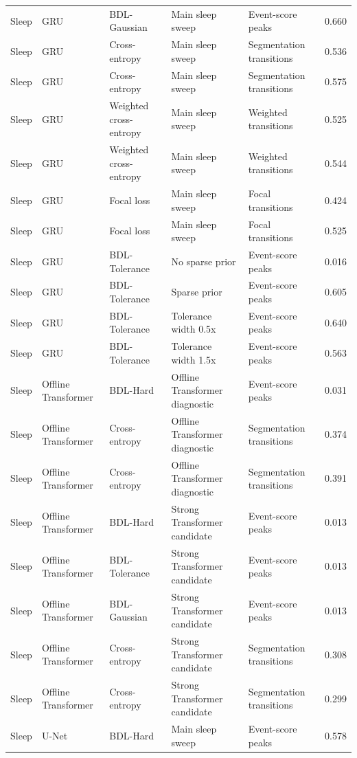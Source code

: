 \begin{tabular}{llllll}
Sleep & GRU & BDL-Gaussian & Main sleep sweep & Event-score peaks & 0.660 \\
Sleep & GRU & Cross-entropy & Main sleep sweep & Segmentation transitions & 0.536 \\
Sleep & GRU & Cross-entropy & Main sleep sweep & Segmentation transitions & 0.575 \\
Sleep & GRU & Weighted cross-entropy & Main sleep sweep & Weighted transitions & 0.525 \\
Sleep & GRU & Weighted cross-entropy & Main sleep sweep & Weighted transitions & 0.544 \\
Sleep & GRU & Focal loss & Main sleep sweep & Focal transitions & 0.424 \\
Sleep & GRU & Focal loss & Main sleep sweep & Focal transitions & 0.525 \\
Sleep & GRU & BDL-Tolerance & No sparse prior & Event-score peaks & 0.016 \\
Sleep & GRU & BDL-Tolerance & Sparse prior & Event-score peaks & 0.605 \\
Sleep & GRU & BDL-Tolerance & Tolerance width 0.5x & Event-score peaks & 0.640 \\
Sleep & GRU & BDL-Tolerance & Tolerance width 1.5x & Event-score peaks & 0.563 \\
Sleep & Offline Transformer & BDL-Hard & Offline Transformer diagnostic & Event-score peaks & 0.031 \\
Sleep & Offline Transformer & Cross-entropy & Offline Transformer diagnostic & Segmentation transitions & 0.374 \\
Sleep & Offline Transformer & Cross-entropy & Offline Transformer diagnostic & Segmentation transitions & 0.391 \\
Sleep & Offline Transformer & BDL-Hard & Strong Transformer candidate & Event-score peaks & 0.013 \\
Sleep & Offline Transformer & BDL-Tolerance & Strong Transformer candidate & Event-score peaks & 0.013 \\
Sleep & Offline Transformer & BDL-Gaussian & Strong Transformer candidate & Event-score peaks & 0.013 \\
Sleep & Offline Transformer & Cross-entropy & Strong Transformer candidate & Segmentation transitions & 0.308 \\
Sleep & Offline Transformer & Cross-entropy & Strong Transformer candidate & Segmentation transitions & 0.299 \\
Sleep & U-Net & BDL-Hard & Main sleep sweep & Event-score peaks & 0.578 \\

\end{tabular}
